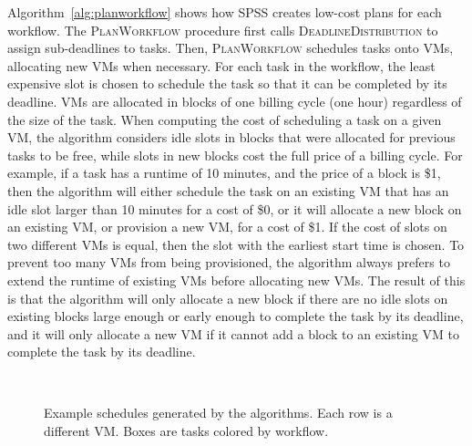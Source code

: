 \documentclass[preprint,5p]{elsarticle}
\begin{document}
Algorithm~\ref{alg:planworkflow} shows how SPSS creates low-cost plans for each
workflow. The \textsc{PlanWorkflow} procedure first calls
\textsc{DeadlineDistribution} to assign sub-deadlines to tasks.
Then, \textsc{PlanWorkflow} schedules
tasks onto VMs, allocating new VMs when necessary. For each task in the
workflow, the least expensive slot is chosen to schedule the task so that it can
be completed by  its deadline. VMs are allocated in blocks of one billing cycle
(one hour) regardless of the size of the task. When computing the cost of
scheduling a task on a given VM, the algorithm considers idle slots in blocks
that were allocated for previous tasks to be free, while slots in new blocks
cost the full price of a billing cycle. 
For example, if a task has a runtime of
10 minutes, and the price of a block is \$1, then the algorithm will either
schedule the task on an existing VM that has an idle slot larger than 10
minutes for a cost of \$0, or it will allocate a new block on an existing VM,
or provision a new VM, for a cost of \$1. 
If the cost of slots on two different
VMs is equal, then the slot with the earliest start time is chosen. To prevent too
many VMs from being provisioned, the algorithm always prefers to extend the
runtime of existing VMs before allocating new VMs. The result of this is that
the algorithm will only allocate a new block if there are no idle slots on
existing blocks large enough or early enough to complete the task by its
deadline, and it will only allocate a new VM if it cannot add a block to an
existing VM to complete the task by its deadline.

\begin{figure}[tb] 
  \centering
  \\
  \caption[Example schedules generated by the algorithms]{Example
  schedules generated by the algorithms. Each row is a different
  VM. Boxes are tasks colored by workflow.}

\end{figure}
\end{document}
